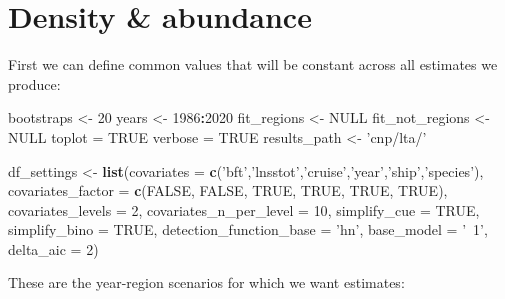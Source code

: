 \documentclass[
]{book}
\newenvironment{Shaded}{\begin{snugshade}}{\end{snugshade}}
\newcommand{\DataTypeTok}[1]{\textcolor[rgb]{0.13,0.29,0.53}{#1}}
\newcommand{\DecValTok}[1]{\textcolor[rgb]{0.00,0.00,0.81}{#1}}
\newcommand{\KeywordTok}[1]{\textcolor[rgb]{0.13,0.29,0.53}{\textbf{#1}}}
\newcommand{\NormalTok}[1]{#1}
\newcommand{\OperatorTok}[1]{\textcolor[rgb]{0.81,0.36,0.00}{\textbf{#1}}}
\newcommand{\OtherTok}[1]{\textcolor[rgb]{0.56,0.35,0.01}{#1}}
\newcommand{\StringTok}[1]{\textcolor[rgb]{0.31,0.60,0.02}{#1}}
\begin{document}
\hypertarget{density-abundance-1}{%
\section*{Density \& abundance}\label{density-abundance-1}}

First we can define common values that will be constant across all estimates we produce:

\begin{Shaded}
\begin{Highlighting}[]
\NormalTok{bootstraps <-}\StringTok{ }\DecValTok{20}
\NormalTok{years <-}\StringTok{ }\DecValTok{1986}\OperatorTok{:}\DecValTok{2020}
\NormalTok{fit_regions <-}\StringTok{ }\OtherTok{NULL}
\NormalTok{fit_not_regions <-}\StringTok{ }\OtherTok{NULL}
\NormalTok{toplot =}\StringTok{ }\OtherTok{TRUE}
\NormalTok{verbose =}\StringTok{ }\OtherTok{TRUE}
\NormalTok{results_path <-}\StringTok{ 'cnp/lta/'}

\NormalTok{df_settings <-}
\StringTok{  }\KeywordTok{list}\NormalTok{(}\DataTypeTok{covariates =} \KeywordTok{c}\NormalTok{(}\StringTok{'bft'}\NormalTok{,}\StringTok{'lnsstot'}\NormalTok{,}\StringTok{'cruise'}\NormalTok{,}\StringTok{'year'}\NormalTok{,}\StringTok{'ship'}\NormalTok{,}\StringTok{'species'}\NormalTok{),}
       \DataTypeTok{covariates_factor =} \KeywordTok{c}\NormalTok{(}\OtherTok{FALSE}\NormalTok{, }\OtherTok{FALSE}\NormalTok{, }\OtherTok{TRUE}\NormalTok{, }\OtherTok{TRUE}\NormalTok{, }\OtherTok{TRUE}\NormalTok{, }\OtherTok{TRUE}\NormalTok{),}
       \DataTypeTok{covariates_levels =} \DecValTok{2}\NormalTok{,}
       \DataTypeTok{covariates_n_per_level =} \DecValTok{10}\NormalTok{,}
       \DataTypeTok{simplify_cue =} \OtherTok{TRUE}\NormalTok{,}
       \DataTypeTok{simplify_bino =} \OtherTok{TRUE}\NormalTok{,}
       \DataTypeTok{detection_function_base =} \StringTok{'hn'}\NormalTok{,}
       \DataTypeTok{base_model =} \StringTok{'~1'}\NormalTok{,}
       \DataTypeTok{delta_aic =} \DecValTok{2}\NormalTok{)}
\end{Highlighting}
\end{Shaded}

These are the year-region scenarios for which we want estimates:
\end{document}

